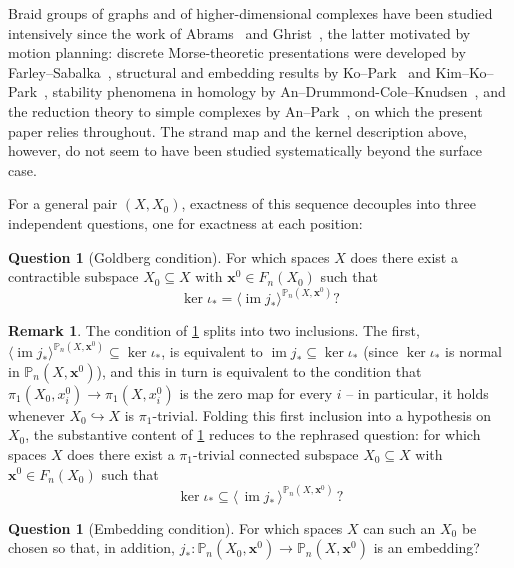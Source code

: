 \documentclass[reqno]{amsart}
\theoremstyle{definition}
\newtheorem{remark}[theorem]{Remark}
\newtheorem{question}[theorem]{Question}
\newcommand\bfx{\mathbf{x}}
\newcommand{\PB}{\mathbb{P}}
\newcommand{\im}{\operatorname{im}}
\newcommand{\co}[1]{\mathopen{\langle}#1\mathclose{\rangle}} %
\newcommand{\base}{\bfx^0}
\numberwithin{equation}{section}
\begin{document}
Braid groups of graphs and of higher-dimensional complexes have
been studied intensively since the work of
Abrams~\cite{Abrams2000} and Ghrist~\cite{Ghrist2001}, the
latter motivated by motion planning: discrete Morse-theoretic
presentations were developed by
Farley--Sabalka~\cite{FarleySabalka2005}, structural and
embedding results by Ko--Park~\cite{KoPark2012} and
Kim--Ko--Park~\cite{KimKoPark2014}, stability phenomena in
homology by
An--Drummond-Cole--Knudsen~\cite{ADK}, and the reduction theory
to simple complexes by An--Park~\cite{AnPark2017}, on which the
present paper relies throughout. The strand map and the kernel
description above, however, do not seem to have been studied
systematically beyond the surface case.

For a general pair \((X, X_0)\), exactness of this sequence
decouples into three independent questions, one for exactness at
each position:

\begin{question}[Goldberg condition]\label{q:goldberg-cond}
\label{q:main}%
For which spaces \(X\) does there exist a contractible subspace
\(X_0\subseteq X\) with \(\base\in F_n(X_0)\) such that
\[
\ker\iota_\ast = \co{\im j_\ast}^{\PB_n(X,\base)}?
\]
\end{question}

\begin{remark}\label{rem:Q1.3-split}
The condition of \cref{q:goldberg-cond} splits into two inclusions. The first,
\(\co{\im j_\ast}^{\PB_n(X,\base)}\subseteq\ker\iota_\ast\), is
equivalent to \(\im j_\ast\subseteq\ker\iota_\ast\) (since
\(\ker\iota_\ast\) is normal in \(\PB_n(X,\base)\)), and this in turn is
equivalent to the condition that
\(\pi_1(X_0, x_i^0)\to \pi_1(X, x_i^0)\) is the zero map for every
\(i\) -- in particular, it holds whenever \(X_0\hookrightarrow X\)
is \(\pi_1\)-trivial. Folding this first inclusion into a
hypothesis on \(X_0\), the substantive content of
\cref{q:goldberg-cond} reduces to the rephrased
question: for which spaces \(X\) does there exist a
\(\pi_1\)-trivial connected subspace \(X_0\subseteq X\) with
\(\base\in F_n(X_0)\) such that
\[
\ker\iota_\ast \subseteq \co{\,\im j_\ast\,}^{\PB_n(X,\base)}\,?
\]
\end{remark}

\begin{question}[Embedding condition]\label{q:embedding-cond}
For which spaces \(X\) can such an \(X_0\) be chosen so that, in
addition, \(j_\ast\colon\PB_n(X_0,\base)\to\PB_n(X,\base)\) is an embedding?
\end{question}
\end{document}

